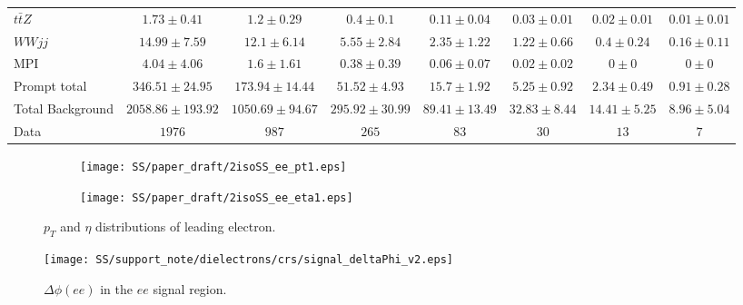 \begin{table*}[htbp]
\begin{center}
{\begin{tabular}{l|c|c|c|c|c|c|c}
$t\bar{t}Z$	& $ 1.73 \pm 0.41 $	& $ 1.2 \pm 0.29 $	& $ 0.4 \pm 0.1 $	& $ 0.11 \pm 0.04 $	& $ 0.03 \pm 0.01 $	& $ 0.02 \pm 0.01 $	& $ 0.01 \pm 0.01 $	\\[+0.05in]
$WWjj$	& $ 14.99 \pm 7.59 $	& $ 12.1 \pm 6.14 $	& $ 5.55 \pm 2.84 $	& $ 2.35 \pm 1.22 $	& $ 1.22 \pm 0.66 $	& $ 0.4 \pm 0.24 $	& $ 0.16 \pm 0.11 $	\\[+0.05in]
MPI	& $ 4.04 \pm 4.06 $	& $ 1.6 \pm 1.61 $	& $ 0.38 \pm 0.39 $	& $ 0.06 \pm 0.07 $	& $ 0.02 \pm 0.02 $	& $ 0 \pm 0 $	& $ 0 \pm 0 $	\\[+0.05in]
\hline
Prompt total	& $ 346.51 \pm 24.95 $	& $ 173.94 \pm 14.44 $	& $ 51.52 \pm 4.93 $	& $ 15.7 \pm 1.92 $	& $ 5.25 \pm 0.92 $	& $ 2.34 \pm 0.49 $	& $ 0.91 \pm 0.28 $	\\[+0.05in]
\hline\hline
Total Background	& $ 2058.86 \pm 193.92 $	& $ 1050.69 \pm 94.67 $	& $ 295.92 \pm 30.99 $	& $ 89.41 \pm 13.49 $	& $ 32.83 \pm 8.44 $	& $ 14.41 \pm 5.25 $	& $ 8.96 \pm 5.04 $	\\[+0.05in]
\hline\hline
Data	& $ 1976 $	& $ 987 $	& $ 265 $	& $ 83 $	& $ 30 $	& $ 13 $	& $ 7 $	\\[+0.05in]

\hline
\end{tabular}
}
\end{center}
\label{tab:2iso_ee_SS}
\end{table*}


\begin{figure}
\begin{subfigure}{.5\textwidth}
  \centering
  \texttt{[image: SS/paper\_draft/2isoSS\_ee\_pt1.eps]}
\end{subfigure}%
\begin{subfigure}{.5\textwidth}
  \centering
  \texttt{[image: SS/paper\_draft/2isoSS\_ee\_eta1.eps]}
\end{subfigure}
\caption{\toDo $p_T$ and $\eta$ distributions of leading electron.}
  \label{fig:signal_kinematics}
\end{figure}

\begin{figure}[h]
\begin{center}
\texttt{[image: SS/support\_note/dielectrons/crs/signal\_deltaPhi\_v2.eps]}
\caption{\toDo $\Delta\phi(ee)$ in the $ee$ signal region.}
\label{fig:delta_phi}
\end{center}
\end{figure}



